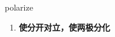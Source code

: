 
\begin{frame}
{\huge polarize}
\begin{center}
\begin{enumerate}\Large
  \item \textbf{使分开对立，使两极分化}
\end{enumerate}
\end{center}
\end{frame}
